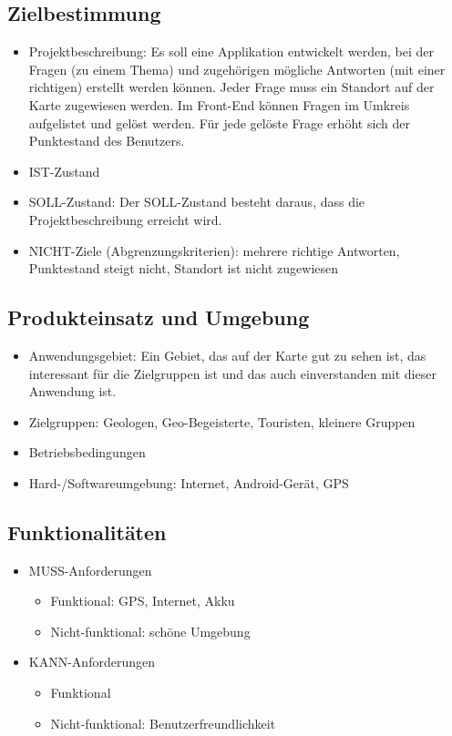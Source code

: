\subsection{Zielbestimmung}
\begin{itemize}
	\item Projektbeschreibung:
	Es soll eine Applikation entwickelt werden, bei der Fragen (zu einem Thema) und zugehörigen mögliche Antworten (mit einer richtigen) erstellt werden können. Jeder Frage muss ein Standort auf der Karte zugewiesen werden. 
	Im Front-End können Fragen im Umkreis aufgelistet und gelöst werden. Für jede gelöste Frage erhöht sich der Punktestand des Benutzers.  
	
	\item IST-Zustand
	
	
	\item SOLL-Zustand:
	Der SOLL-Zustand besteht daraus, dass die Projektbeschreibung erreicht wird. 
	\item NICHT-Ziele (Abgrenzungskriterien):
	mehrere richtige Antworten,
	Punktestand steigt nicht,
	Standort ist nicht zugewiesen
\end{itemize}
\subsection{Produkteinsatz und Umgebung}
\begin{itemize}
	\item Anwendungsgebiet:
	Ein Gebiet, das auf der Karte gut zu sehen ist, das interessant für die Zielgruppen ist und das auch einverstanden mit dieser Anwendung ist. 
	\item Zielgruppen:
	Geologen, Geo-Begeisterte, Touristen, kleinere Gruppen
	\item Betriebsbedingungen
	\item Hard-/Softwareumgebung:
	Internet, Android-Gerät, GPS
\end{itemize}
\subsection{Funktionalitäten}
\begin{itemize}
	\item MUSS-Anforderungen
	\begin{itemize}
		\item Funktional:
		GPS, Internet, Akku
		\item Nicht-funktional:
		schöne Umgebung
	\end{itemize}
	\item KANN-Anforderungen
	\begin{itemize}
		\item Funktional
		\item Nicht-funktional:
		Benutzerfreundlichkeit
	\end{itemize}
\end{itemize}
